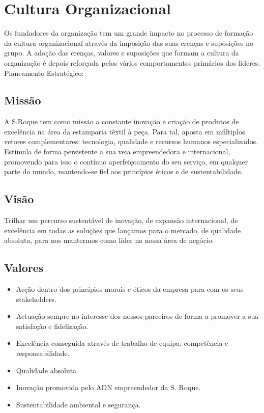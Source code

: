 {





\newpage
\section{Cultura Organizacional}
\qquad Os fundadores da organização tem um grande impacto no processo de formação da cultura organizacional através da imposição das suas crenças e suposições no grupo. A adoção das crenças, valores e suposições que formam a cultura da organização é depois reforçada pelos vários comportamentos primários dos lideres.\\

Planeamento Estratégico:

\subsection{Missão}

A S.Roque tem como missão a constante inovação e criação de produtos de excelência na área da estamparia têxtil à peça. Para tal, aposta em múltiplos vetores complementares: tecnologia, qualidade e recursos humanos especializados. Estimula de forma persistente a sua veia empreendedora e internacional, promovendo para isso o contínuo aperfeiçoamento do seu serviço, em qualquer parte do mundo, mantendo-se fiel aos princípios éticos e de sustentabilidade.

\subsection{Visão}
Trilhar um percurso sustentável de inovação, de expansão internacional, de excelência em todas as soluções que lançamos para o mercado, de qualidade absoluta, para nos mantermos como líder na nossa área de negócio.

\subsection{Valores}
\begin{itemize}
\item Acção dentro dos princípios morais e éticos da empresa para com os seus stakeholders.
\item Actuação sempre no interesse dos nossos parceiros de forma a promover a sua satisfação e fidelização.
\item Excelência conseguida através de trabalho de equipa, competência e responsabilidade.
\item Qualidade absoluta.
\item Inovação promovida pelo ADN empreendedor da S. Roque.
\item Sustentabilidade ambiental e segurança.
\end{itemize}

}
